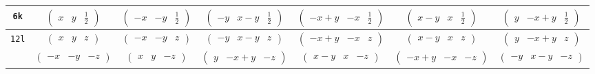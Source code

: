 \documentclass[fleqn,9pt,landscape]{jsarticle}
\begin{document}
\begin{center}
\begin{longtable}{ccccccc}
{\tt 6k} & $ \begin{pmatrix} x & y & \frac{1}{2} \end{pmatrix} $ & $ \begin{pmatrix} - x & - y & \frac{1}{2} \end{pmatrix} $ & $ \begin{pmatrix} - y & x - y & \frac{1}{2} \end{pmatrix} $ & $ \begin{pmatrix} - x + y & - x & \frac{1}{2} \end{pmatrix} $ & $ \begin{pmatrix} x - y & x & \frac{1}{2} \end{pmatrix} $ & $ \begin{pmatrix} y & - x + y & \frac{1}{2} \end{pmatrix} $ \\ \hline
{\tt 12l} & $ \begin{pmatrix} x & y & z \end{pmatrix} $ & $ \begin{pmatrix} - x & - y & z \end{pmatrix} $ & $ \begin{pmatrix} - y & x - y & z \end{pmatrix} $ & $ \begin{pmatrix} - x + y & - x & z \end{pmatrix} $ & $ \begin{pmatrix} x - y & x & z \end{pmatrix} $ & $ \begin{pmatrix} y & - x + y & z \end{pmatrix} $ \\
& $ \begin{pmatrix} - x & - y & - z \end{pmatrix} $ & $ \begin{pmatrix} x & y & - z \end{pmatrix} $ & $ \begin{pmatrix} y & - x + y & - z \end{pmatrix} $ & $ \begin{pmatrix} x - y & x & - z \end{pmatrix} $ & $ \begin{pmatrix} - x + y & - x & - z \end{pmatrix} $ & $ \begin{pmatrix} - y & x - y & - z \end{pmatrix} $ \\
\end{longtable}
\end{center}
\end{document}
